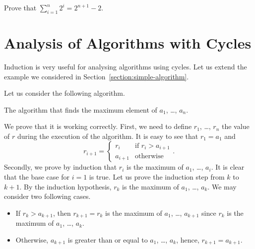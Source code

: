 \begin{exercise}
    Prove that $\sum_{i = 1}^n 2^i = 2^{n + 1} - 2$.
\end{exercise}

\section{Analysis of Algorithms with Cycles}

Induction is very useful for analysing algorithms using cycles. Let us extend
the example we considered in Section~\ref{section:simple-algorithm}.

Let us consider the following algorithm.
\begin{algorithm}
  \begin{algorithmic}[1]
        \EndIf
      \EndFor
      \State{}
    \EndFunction
  \end{algorithmic}
  \caption{The algorithm that finds the maximum element of $a_1$, \dots, $a_n$.}
\end{algorithm}
We prove that it is working correctly. First, we need to define $r_1$,
\dots, $r_n$ the value of $r$ during the execution of the algorithm.
It is easy to see that $r_1 = a_1$ and
\[
    r_{i + 1} =
    \begin{cases}
        r_i & \text{if } r_i > a_{i + 1} \\
        a_{i + 1} & \text{otherwise}
    \end{cases}.
\]
Secondly, we prove by induction that $r_i$ is the maximum of $a_1$, \dots,
$a_i$. It is clear that the base case for $i = 1$ is true. Let us prove the
induction step from $k$ to $k + 1$. By the induction hypothesis, $r_k$
is the maximum of $a_1$, \dots, $a_k$. We may consider two following cases.
\begin{itemize}
    \item If $r_k > a_{k + 1}$, then $r_{k + 1} = r_{k}$ is the maximum of $a_1$,
        \dots, $a_{k + 1}$ since $r_k$ is the maximum of $a_1$, \dots, $a_k$.
    \item Otherwise, $a_{k + 1}$ is greater than or equal to $a_1$, \dots, $a_k$,
        hence, $r_{k + 1} = a_{k + 1}$.
\end{itemize}

